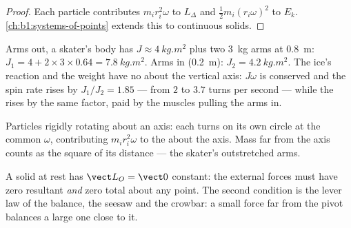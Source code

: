 \begin{proof}
Each particle contributes $m_ir_i^2\omega$ to $L_\Delta$ and
$\tfrac12 m_i(r_i\omega)^2$ to $E_k$. \cref{ch:b1:systems-of-points}
extends this to continuous solids.
\end{proof}

\begin{example}\label{ex:b1:angular-momentum:skater}
Arms out, a skater's body has $J \approx \qty{4}{kg.m^2}$ plus two
\qty{3}{kg} arms at \qty{0.8}{m}: $J_1 = 4 + 2 \times 3 \times 0.64 =
\qty{7.8}{kg.m^2}$. Arms in (\qty{0.2}{m}): $J_2 = \qty{4.2}{kg.m^2}$.
The ice's reaction and the weight have no  about the vertical
axis: $J\omega$ is conserved and the spin rate rises by $J_1/J_2 = 1.85$
--- from $2$ to $3.7$ turns per second --- while the  rises
by the same factor, paid by the muscles pulling the arms in.
\end{example}

\begin{omfigure}

{\small Particles rigidly rotating about an axis: each turns on its own
circle at the common $\omega$, contributing $m_ir_i^2\omega$ to the
 about the axis. Mass far from the axis counts as the
square of its distance --- the skater's outstretched arms.}
\end{omfigure}

\begin{remark}[Statics]\label{rem:b1:angular-momentum:statics}
A solid at rest has $\vect L_O = \vect 0$ constant: the external forces
must have zero resultant \emph{and} zero total  about any point.
The second condition is the lever law of the balance, the seesaw and
the crowbar: a small force far from the pivot balances a large one close
to it.
\end{remark}

